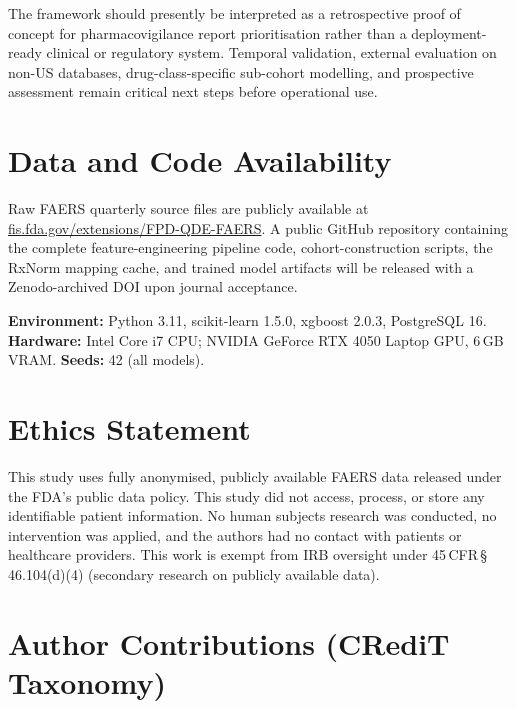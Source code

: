 \documentclass[10pt,twocolumn]{article}
\newcommand{\FAERS}{\textsf{FAERS}\xspace}
\begin{document}
The framework should presently be interpreted as a retrospective proof of concept for pharmacovigilance report prioritisation rather than a deployment-ready clinical or regulatory system. Temporal validation, external evaluation on non-US databases, drug-class-specific sub-cohort modelling, and prospective assessment remain critical next steps before operational use.
 
\section*{Data and Code Availability}
 
Raw \FAERS quarterly source files are publicly available at \href{https://fis.fda.gov/extensions/FPD-QDE-FAERS/FPD-QDE-FAERS.html}{fis.fda.gov/extensions/FPD-QDE-FAERS}. A public GitHub repository containing the complete feature-engineering pipeline code, cohort-construction scripts, the RxNorm mapping cache, and trained model artifacts will be released with a Zenodo-archived DOI upon journal acceptance.
 
\noindent\textbf{Environment:} Python 3.11, scikit-learn 1.5.0,
xgboost 2.0.3,
PostgreSQL 16.
\textbf{Hardware:} Intel Core i7 CPU; NVIDIA GeForce RTX 4050 Laptop GPU, 6\,GB VRAM.
\textbf{Seeds:} 42 (all models).
 
\section*{Ethics Statement}
 
This study uses fully anonymised, publicly available \FAERS
data released under the FDA's public data policy. This study did not
access, process, or store any identifiable patient information.
No human subjects research was conducted, no intervention was
applied, and the authors had no contact with patients or healthcare
providers. This work is exempt from IRB oversight under
45\,CFR\,\S\,46.104(d)(4) (secondary research on publicly
available data).
 
\section*{Author Contributions (CRediT Taxonomy)}
 
\end{document}
